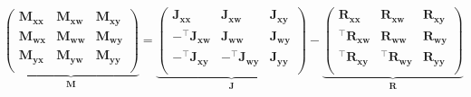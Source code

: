 \documentclass[11pt, oneside]{article}      %
\begin{document}
$$
\underbrace{\left(
\begin{array}{lll}
\mathbf{M_{xx}} & \mathbf{M_{xw}} & \mathbf{M_{xy}} \\
\mathbf{M_{wx}} & \mathbf{M_{ww}} & \mathbf{M_{wy}} \\
\mathbf{M_{yx}} & \mathbf{M_{yw}} &  \mathbf{M_{yy}} \\
\end{array}
\right)}_{\mathbf M}
=
\underbrace{\left(
\begin{array}{lll}
\mathbf{J_{xx}} & \mathbf{J_{xw}} & \mathbf{J_{xy}} \\
-^\intercal\mathbf{J_{xw}} & \mathbf{J_{ww}} & \mathbf{J_{wy}} \\
-^\intercal\mathbf{J_{xy}} & -^\intercal\mathbf{J_{wy}} &  \mathbf{J_{yy}} \\
\end{array}
\right)}_{\mathbf J}
-
\underbrace{\left(
\begin{array}{lll}
\mathbf{R_{xx}} & \mathbf{R_{xw}} & \mathbf{R_{xy}} \\
^\intercal\mathbf{R_{xw}} & \mathbf{R_{ww}} & \mathbf{R_{wy}} \\
^\intercal\mathbf{R_{xy}} & ^\intercal\mathbf{R_{wy}} &  \mathbf{R_{yy}} \\
\end{array}
\right)}_{\mathbf R}
$$

%
\end{document}
